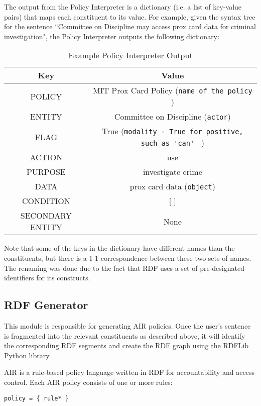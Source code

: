 \documentclass{llncs}
\begin{document}
The output from the Policy Interpreter is a dictionary (i.e. a list of key-value pairs) that maps each constituent to its value. For example, given the syntax tree for the sentence ``Committee on Discipline may access prox card data for criminal investigation", the Policy Interpreter outputs the following dictionary:

\begin{table}[h]
\centering
\begin{tabular}{|c|c|}
\hline
\textbf{Key} & \textbf{Value}\\
\hline
POLICY & MIT Prox Card Policy (\verb!name of the policy! )\\
ENTITY & Committee on Discipline (\verb!actor!)\\
FLAG & True (\verb!modality - True for positive, such as 'can' ! )\\
ACTION & use \\
PURPOSE &investigate crime \\
DATA & prox card data (\verb!object!) \\
CONDITION  &[  ] \\
SECONDARY ENTITY & None\\
\hline
\end{tabular}
\caption{Example Policy Interpreter Output}
\label{tab:policy-interpreter-output}
\end{table}

Note that some of the keys in the dictionary have different names than the constituents, but there is a 1-1 correspondence between these two sets of names. The renaming was done due to the fact that RDF uses a set of pre-designated identifiers for its constructs. 


\subsection{RDF Generator}

This module is responsible for generating AIR \cite{air} policies. Once the user's sentence is fragmented into the relevant constituents as described above, it will identify the corresponding RDF segments and create the RDF graph using the RDFLib \cite{rdflib} Python library.

AIR is a rule-based policy language written in RDF for accountability and access control. Each AIR policy consists of one or more rules:

\begin{verbatim}
policy = { rule* } 
\end{verbatim}
\end{document}
